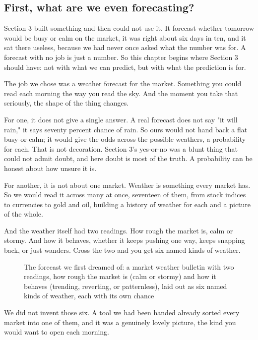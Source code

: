 \documentclass[11pt]{article} %
\begin{document}
\subsection{First, what are we even forecasting?}


Section 3 built something and then could not use it. It forecast whether tomorrow would be busy or calm on the market, it was right about six days in ten, and it sat there useless, because we had never once asked what the number was for. A forecast with no job is just a number. So this chapter begins where Section 3 should have: not with what we can predict, but with what the prediction is for.

The job we chose was a weather forecast for the market. Something you could read each morning the way you read the sky. And the moment you take that seriously, the shape of the thing changes.

For one, it does not give a single answer. A real forecast does not say "it will rain," it says seventy percent chance of rain. So ours would not hand back a flat busy-or-calm; it would give the odds across the possible weathers, a probability for each. That is not decoration. Section 3's yes-or-no was a blunt thing that could not admit doubt, and here doubt is most of the truth. A probability can be honest about how unsure it is.

For another, it is not about one market. Weather is something every market has. So we would read it across many at once, seventeen of them, from stock indices to currencies to gold and oil, building a history of weather for each and a picture of the whole.

And the weather itself had two readings. How rough the market is, calm or stormy. And how it behaves, whether it keeps pushing one way, keeps snapping back, or just wanders. Cross the two and you get six named kinds of weather.

\begin{figure}[htbp]
\centering

\caption{The forecast we first dreamed of: a market weather bulletin with two readings, how rough the market is (calm or stormy) and how it behaves (trending, reverting, or patternless), laid out as six named kinds of weather, each with its own chance}
\end{figure}


We did not invent those six. A tool we had been handed already sorted every market into one of them, and it was a genuinely lovely picture, the kind you would want to open each morning.
\end{document}
